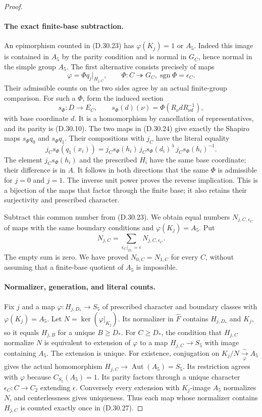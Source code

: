 \begin{proof}
\paragraph{The exact finite-base subtraction.}
An epimorphism counted in
\textup{(D.30.23)} has
$\varphi(K_j)=1$ or $A_5$.
Indeed this image is contained in $A_5$
by the parity condition and is normal in
$G_C$, hence normal in the simple group
$A_5$.  The first alternative consists
precisely of maps
\[
 \varphi=\Phi q_j|_{H_{j,C}},\qquad
 \Phi:C\twoheadrightarrow G_C,
              \operatorname{sgn}\Phi=\epsilon_C.
 \tag{D.30.24}
\]
Their admissible counts on the two sides
agree by an actual finite-group comparison.
For such a $\Phi$, form the induced section
\[
 s_\Phi:D\longrightarrow E_C,
 \qquad
 s_\Phi(d)(\nu)=\Phi(R_\nu dR_{\nu d}^{-1}),
 \tag{D.30.25}
\]
with base coordinate $d$.
It is a homomorphism by cancellation of
representatives, and its parity is
\textup{(D.30.10)}.  The two maps in
\textup{(D.30.24)} give exactly the
Shapiro maps $s_\Phi q_0$ and $s_\Phi q_1$.
Their compositions with $j_C$ have the
literal equality
\[
 j_Cs_\Phi(q_1(x_i))
  =j_Cs_\Phi(h_i)\,
       j_Cs_\Phi(d_i)^\lambda\,
                      j_Cs_\Phi(h_i)^{-1}.
 \tag{D.30.26}
\]
The element $j_Cs_\Phi(h_i)$ and the
prescribed $H_i$ have the same base
coordinate; their difference is in $A$.
It follows in both directions that the
same $\Phi$ is admissible for $j=0$ and
$j=1$.  The inverse unit power proves
the reverse implication.  This is a
bijection of the maps that factor through
the finite base; it also retains their
surjectivity and prescribed character.

Subtract this common number from
\textup{(D.30.23)}.  We obtain equal
numbers $N_{j,C,\epsilon_C}$ of maps
with the same boundary conditions and
$\varphi(K_j)=A_5$.  Put
\[
       N_{j,C}=\sum_{\epsilon_C|_{D_*}=\epsilon}
                             N_{j,C,\epsilon_C}.
 \tag{D.30.27}
\]
The empty sum is zero.  We have proved
$N_{0,C}=N_{1,C}$ for every $C$, without
assuming that a finite-base quotient of
$A_5$ is impossible.

\paragraph{Normalizer, generation, and literal counts.}
Fix $j$ and a map
$\varphi:H_{j,D_*}\to S_5$ of prescribed
character and boundary classes with
$\varphi(K_j)=A_5$.  Let
$N=\ker(\varphi|_{K_j})$.
Its normalizer in $\widehat F$ contains
$H_{j,D_*}$ and $K_j$, so it equals
$H_{j,B}$ for a unique $B\geq D_*$.
For $C\geq D_*$, the condition that
$H_{j,C}$ normalize $N$ is equivalent
to extension of $\varphi$ to a map
$H_{j,C}\to S_5$ with image containing
$A_5$.  The extension is unique.
For existence, conjugation on
$K_j/N\xrightarrow[\varphi]{\sim}A_5$
gives the actual homomorphism
$H_{j,C}\to\operatorname{Aut}(A_5)=S_5$.
Its restriction agrees with $\varphi$
because $C_{S_5}(A_5)=1$.
Its parity factors through a unique
character $\epsilon_C:C\to C_2$
extending $\epsilon$.  Conversely every
extension with $K_j$-image $A_5$
normalizes $N$, and centerlessness gives
uniqueness.  Thus each map whose
normalizer contains $H_{j,C}$ is counted
exactly once in \textup{(D.30.27)}.


\end{proof}
